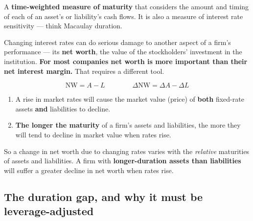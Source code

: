 
\begin{lrdefbox}
A \textbf{time-weighted measure of maturity} that considers the amount and timing of each of an asset's or liability's cash flows. It is also a measure of interest rate sensitivity --- think Macaulay duration.
\end{lrdefbox}

Changing interest rates can do serious damage to another aspect of a firm's performance --- its \textbf{net worth}, the value of the stockholders' investment in the institution. \textbf{For most companies net worth is more important than their net interest margin.} That requires a different tool.

\begin{lrfmlbox}
\[ \text{NW} = A - L \qquad\qquad \Delta\text{NW} = \Delta A - \Delta L \]
\end{lrfmlbox}

\begin{lrkeybox}
\begin{enumerate}
\item A rise in market rates will cause the market value (price) of \textbf{both} fixed-rate assets \textbf{and} liabilities to decline.
\item \textbf{The longer the maturity} of a firm's assets and liabilities, the more they will tend to decline in market value when rates rise.
\end{enumerate}
So a change in net worth due to changing rates varies with the \emph{relative} maturities of assets and liabilities. A firm with \textbf{longer-duration assets than liabilities} will suffer a greater decline in net worth when rates rise.
\end{lrkeybox}

\subsection{The duration gap, and why it must be leverage-adjusted}

